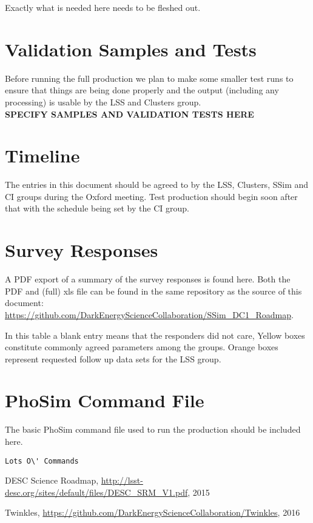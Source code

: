 \documentclass[12pt,letterpaper]{article}
\begin{document}
\noindent
Exactly what is needed here needs to be fleshed out.

\section{Validation Samples and Tests}

Before running the full production we plan to make some smaller test
runs to ensure that things are being done properly and the output
(including any processing) is usable by the LSS and Clusters group. \\


\noindent
{\bf SPECIFY SAMPLES AND VALIDATION TESTS HERE}


\section{Timeline}

The entries in this document should be agreed to by the LSS, Clusters,
SSim and CI groups during the Oxford meeting.  Test production should
begin soon after that with the schedule being set by the CI group.

\begin{appendices}

\section{Survey Responses}
\label{sec:survey}

A PDF export of a summary of the survey responses is found here.  Both
the PDF and (full) xls file can be found in the same repository as the
source of this document:
\url{https://github.com/DarkEnergyScienceCollaboration/SSim_DC1_Roadmap}.

In this table a blank entry means that the responders did not care,
Yellow boxes constitute commonly agreed parameters among the groups.
Orange boxes represent requested follow up data sets for the LSS group.

 

\section{PhoSim Command File}
\label{sec:command-file}

The basic PhoSim command file used to run the production should be
included here.

\begin{verbatim}
Lots O\' Commands
\end{verbatim}

\end{appendices}

\begin{thebibliography}{100}

DESC Science Roadmap,
\url{http://lsst-desc.org/sites/default/files/DESC_SRM_V1.pdf}, 2015

 Twinkles,
  \url{https://github.com/DarkEnergyScienceCollaboration/Twinkles},
  2016

\end{thebibliography}
\end{document}

